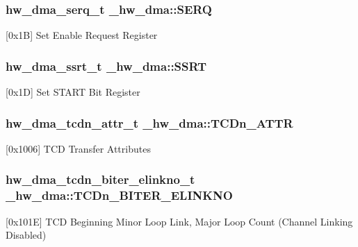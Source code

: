 \subsubsection[{\texorpdfstring{S\+E\+RQ}{SERQ}}]{ {\bf hw\+\_\+dma\+\_\+serq\+\_\+t} \+\_\+hw\+\_\+dma\+::\+S\+E\+RQ}\hypertarget{struct__hw__dma_ac92a13730ecfab371b7c17ea51a1806b}{}\label{struct__hw__dma_ac92a13730ecfab371b7c17ea51a1806b}
\mbox{[}0x1B\mbox{]} Set Enable Request Register 
\subsubsection[{\texorpdfstring{S\+S\+RT}{SSRT}}]{ {\bf hw\+\_\+dma\+\_\+ssrt\+\_\+t} \+\_\+hw\+\_\+dma\+::\+S\+S\+RT}\hypertarget{struct__hw__dma_ac7fcdd4e8097945f4b5615bccd76dd03}{}\label{struct__hw__dma_ac7fcdd4e8097945f4b5615bccd76dd03}
\mbox{[}0x1D\mbox{]} Set S\+T\+A\+RT Bit Register 
\subsubsection[{\texorpdfstring{T\+C\+Dn\+\_\+\+A\+T\+TR}{TCDn_ATTR}}]{ {\bf hw\+\_\+dma\+\_\+tcdn\+\_\+attr\+\_\+t} \+\_\+hw\+\_\+dma\+::\+T\+C\+Dn\+\_\+\+A\+T\+TR}\hypertarget{struct__hw__dma_adfbdaf88fdea94a66b4d7655d01bb201}{}\label{struct__hw__dma_adfbdaf88fdea94a66b4d7655d01bb201}
\mbox{[}0x1006\mbox{]} T\+CD Transfer Attributes 
\subsubsection[{\texorpdfstring{T\+C\+Dn\+\_\+\+B\+I\+T\+E\+R\+\_\+\+E\+L\+I\+N\+K\+NO}{TCDn_BITER_ELINKNO}}]{ {\bf hw\+\_\+dma\+\_\+tcdn\+\_\+biter\+\_\+elinkno\+\_\+t} \+\_\+hw\+\_\+dma\+::\+T\+C\+Dn\+\_\+\+B\+I\+T\+E\+R\+\_\+\+E\+L\+I\+N\+K\+NO}\hypertarget{struct__hw__dma_a0af5ef12c413965d8db9cfcd0eb2a2d5}{}\label{struct__hw__dma_a0af5ef12c413965d8db9cfcd0eb2a2d5}
\mbox{[}0x101E\mbox{]} T\+CD Beginning Minor Loop Link, Major Loop Count (Channel Linking Disabled) 
